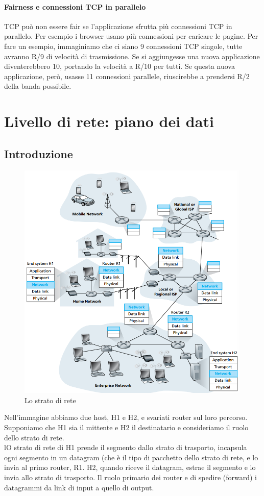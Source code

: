 \documentclass[11pt,a4paper]{article}
\begin{document}
\paragraph{Fairness e connessioni TCP in parallelo}
TCP può non essere fair se l'applicazione sfrutta più connessioni TCP in parallelo. Per esempio i browser usano più connessioni per caricare le pagine. Per fare un esempio, immaginiamo che ci siano 9 connessioni TCP singole, tutte avranno R/9 di velocità di trasmissione. Se si aggiungesse una nuova applicazione diventerebbero 10, portando la velocità a R/10 per tutti. Se questa nuova applicazione, però, usasse 11 connessioni parallele, riuscirebbe a prendersi R/2 della banda possibile.

\section{Livello di rete: piano dei dati}
\subsection{Introduzione}
\begin{figure}
	\includegraphics[scale=0.6]{img/049.png}
	\caption{Lo strato di rete}
\end{figure}
Nell'immagine abbiamo due host, H1 e H2, e svariati router sul loro percorso. Supponiamo che H1 sia il mittente e H2 il destinatario e consideriamo il ruolo dello strato di rete. \\
lO strato di rete di H1 prende il segmento dallo strato di trasporto, incapsula ogni segmento in un datagram (che è il tipo di pacchetto dello strato di rete, e lo invia al primo router, R1. H2, quando riceve il datagram, estrae il segmento e lo invia allo strato di trasporto. Il ruolo primario dei router e di spedire (forward) i datagrammi da link di input a quello di output.
\end{document}
